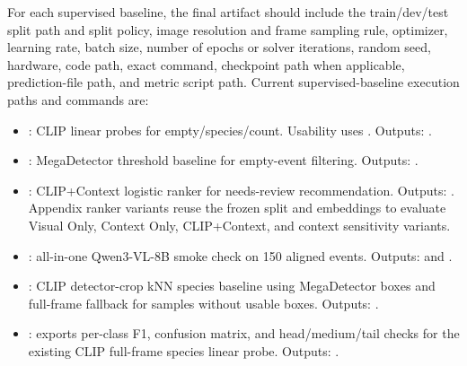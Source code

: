 \documentclass{article}
\begin{document}
For each supervised baseline, the final artifact should include the train/dev/test split path and split policy, image resolution and frame sampling rule, optimizer, learning rate, batch size, number of epochs or solver iterations, random seed, hardware, code path, exact command, checkpoint path when applicable, prediction-file path, and metric script path. Current supervised-baseline execution paths and commands are:
\begin{itemize}
\item {}: CLIP linear probes for empty/species/count. Usability uses . Outputs: .
\item {}: MegaDetector threshold baseline for empty-event filtering. Outputs: .
\item {}: CLIP+Context logistic ranker for needs-review recommendation. Outputs: . Appendix ranker variants reuse the frozen split and embeddings to evaluate Visual Only, Context Only, CLIP+Context, and context sensitivity variants.
\item {}: all-in-one Qwen3-VL-8B smoke check on 150 aligned events. Outputs:  and .
\item {}: CLIP detector-crop kNN species baseline using MegaDetector boxes and full-frame fallback for samples without usable boxes. Outputs: .
\item {}: exports per-class F1, confusion matrix, and head/medium/tail checks for the existing CLIP full-frame species linear probe. Outputs: .

\end{itemize}
\end{document}
